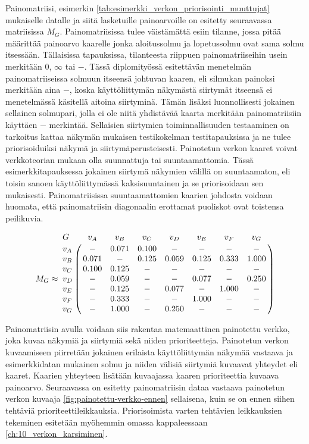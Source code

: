   Painomatriisi, esimerkin \ref{tab:esimerkki_verkon_priorisointi_muuttujat} mukaiselle datalle ja siitä lasketuille painoarvoille on esitetty seuraavassa matriisissa \(M_G\).
  Painomatriisissa tulee väistämättä esiin tilanne, jossa pitää määrittää painoarvo kaarelle jonka aloitussolmu ja lopetussolmu ovat sama solmu itsessään.
  Tällaisissa tapauksissa, tilanteesta riippuen painomatriiseihin usein merkitään \(0\), \(\infty\) tai \(-\).
  Tässä diplomityössä esitettävän menetelmän painomatriiseissa solmuun itseensä johtuvan kaaren, eli silmukan painoksi merkitään aina \(-\), koska käyttöliittymän näkymästä siirtymät itseensä ei menetelmässä käsitellä aitoina siirtyminä.
  Tämän lisäksi luonnollisesti jokainen sellainen solmupari, jolla ei ole niitä yhdistävää kaarta merkitään painomatriisiin käyttäen \(-\) merkintää.
  Sellaisien siirtymien toiminnallisuuden testaaminen on tarkoitus kattaa näkymän mukaisen testikokelman testitapauksissa ja ne tulee priorisoiduiksi näkymä ja siirtymäperusteisesti.
  Painotetun verkon kaaret voivat verkkoteorian mukaan olla suunnattuja tai suuntaamattomia.
  Tässä esimerkkitapauksessa jokainen siirtymä näkymien välillä on suuntaamaton, eli toisin sanoen käyttöliittymässä kaksisuuntainen ja se priorisoidaan sen mukaisesti.
  Painomatriisissa suuntaamattomien kaarien johdosta voidaan huomata, että painomatriisin diagonaalin erottamat puoliskot ovat toistensa peilikuvia.

  \[
    M_G \approx
    \bordermatrix{
      G   & v_A   & v_B   & v_C   & v_D   & v_E   & v_F   & v_G   \cr
      v_A & -     & 0.071 & 0.100 & -     & -     & -     & -     \cr
      v_B & 0.071 & -     & 0.125 & 0.059 & 0.125 & 0.333 & 1.000 \cr
      v_C & 0.100 & 0.125 & -     & -     & -     & -     & -     \cr
      v_D & -     & 0.059 & -     & -     & 0.077 & -     & 0.250 \cr
      v_E & -     & 0.125 & -     & 0.077 & -     & 1.000 & -     \cr
      v_F & -     & 0.333 & -     & -     & 1.000 & -     & -     \cr
      v_G & -     & 1.000 & -     & 0.250 & -     & -     & -     \cr
    }
  \]

  Painomatriisin avulla voidaan siis rakentaa matemaattinen painotettu verkko, joka kuvaa näkymiä ja siirtymiä sekä niiden prioriteetteja.
  Painotetun verkon kuvaamiseen piirretään jokainen erilaista käyttöliittymän näkymää vastaava ja esimerkkidatan mukainen solmu ja niiden välisiä siirtymiä kuvaavat yhteydet eli kaaret.
  Kaarien yhteyteen lisätään kuvaajassa kaaren prioriteettia kuvaava painoarvo.
  Seuraavassa on esitetty painomatriisin dataa vastaava painotetun verkon kuvaaja \ref{fig:painotettu-verkko-ennen} sellaisena, kuin se on ennen siihen tehtäviä prioriteettileikkauksia.
  Priorisoimista varten tehtävien leikkauksien tekeminen esitetään myöhemmin omassa kappaleessaan \ref{ch:10_verkon_karsiminen}.


